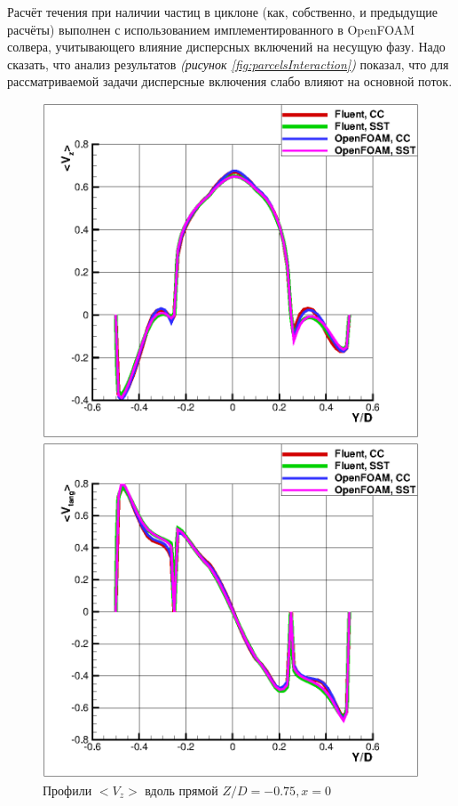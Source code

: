 Расчёт течения при наличии частиц в циклоне (как, собственно, и предыдущие расчёты) выполнен с использованием имплементированного в OpenFOAM солвера, учитывающего влияние дисперсных включений на несущую фазу. Надо сказать, что анализ результатов \textit{(рисунок \ref{fig:parcelsInteraction})} показал, что для рассматриваемой задачи дисперсные включения слабо влияют на основной поток.

\newpage
 \begin{figure}[h]
	\begin{minipage}{0.475\linewidth}
		\includegraphics[scale=0.66]{axialCyclone}
		\caption{Профили $<V_{z}>$ вдоль прямой $Z/D=-0.75, x=0$}
		\label{fig:axialCyclone}
	\end{minipage}
	\hspace{0.5em}
	\begin{minipage}{0.475\linewidth}
		\includegraphics[scale=0.66]{tangentialCyclone}

\end{minipage}
\end{figure}
